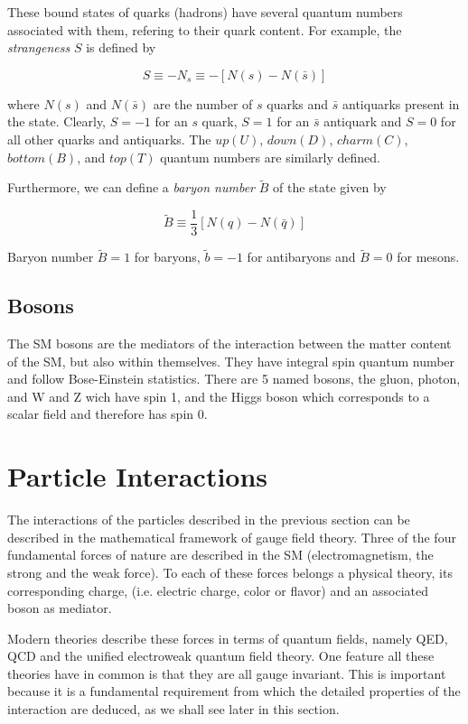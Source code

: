 These bound states of quarks (hadrons) have several quantum numbers associated with them, refering to their quark content. For example, the \textit{strangeness} $S$ is defined by

\begin{equation}
S\equiv -N_{s}\equiv -[N(s)-N(\bar{s})]
\end{equation}

where $N(s)$ and $N(\bar{s})$ are the number of $s$ quarks and $\bar{s}$ antiquarks present in the state. Clearly, $S=-1$ for an $s$ quark, $S=1$ for an $\bar{s}$ antiquark and $S=0$ for all other quarks and antiquarks. The $up(U)$, $down(D)$, $charm (C)$, $bottom(B)$, and $top(T)$ quantum numbers are similarly defined.

Furthermore, we can define a \textit{baryon number} $\tilde{B}$ of the state given by

\begin{equation}
\tilde{B} \equiv \frac{1}{3}[N(q)-N(\bar{q})]
\end{equation}

Baryon number $\tilde{B} = 1$ for baryons, $\tilde{b}=-1$ for antibaryons and $\tilde{B}=0$ for mesons.


\subsection{Bosons}
The SM bosons are the mediators of the interaction between the matter content of the SM, but also within themselves. They have integral spin quantum number and follow Bose-Einstein statistics. There are 5 named bosons, the gluon, photon, and W and Z wich have spin 1, and the Higgs boson which corresponds to a scalar field and therefore has spin 0.

\section{Particle Interactions}
The interactions of the particles described in the previous section can be described in the mathematical framework of gauge field theory. Three of the four fundamental forces of nature are described in the SM (electromagnetism, the strong and the weak force). To each of these forces belongs a physical theory, its corresponding charge, (i.e. electric charge, color or flavor) and an associated boson as mediator.

Modern theories describe these forces in terms of quantum fields, namely QED, QCD and the unified electroweak quantum field theory. One feature all these theories have in common is that they are all gauge invariant. This is important because it is a fundamental requirement from which the detailed properties of the interaction are deduced, as we shall see later in this section.

